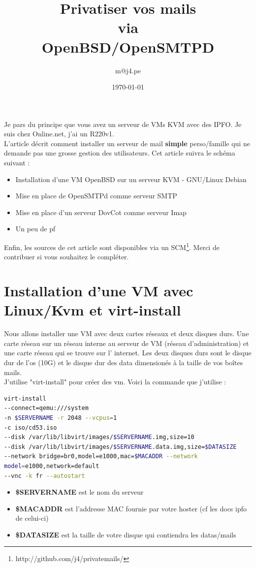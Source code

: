 \documentclass[a4paper,11pt]{article}
\title{Privatiser vos mails\\via\\OpenBSD/OpenSMTPD}
\author{m@j4.pe}
\date{\today}
\begin{document}
\maketitle

\abstract 

Je pars du principe que vous avez un serveur de VMs KVM avec des IPFO. Je suis
chez Online.net, j'ai un R220v1.\\
L'article décrit comment installer un serveur de mail {\bf simple} perso/famille 
qui ne demande pas une grosse gestion des utilisateurs.
Cet article suivra le schéma suivant :\\
\begin{itemize}
	\item Installation d'une VM OpenBSD sur un serveur KVM - GNU/Linux Debian
	\item Mise en place de OpenSMTPd comme serveur SMTP
	\item Mise en place d'un serveur DovCot comme serveur Imap
	\item Un peu de pf
\end{itemize} 
\vspace{5mm}
Enfin, les sources de cet article sont disponibles via un SCM\footnote{http://github.com/j4/privatemails/}. 
Merci de contribuer si vous souhaitez le compléter.

\section*{Installation d'une VM avec Linux/Kvm et virt-install}

Nous allons installer une VM avec deux cartes réseaux et deux disques durs. Une
carte réseau sur un réseau interne au serveur de VM (réseau d'administration)
et une carte réseau qui se trouve sur l' internet. Les deux disques durs sont
le disque dur de l'os (10G) et le disque dur des data dimensionés à la taille
de vos boîtes mails.\\
J'utilise "virt-install" pour créer des vm. Voici la commande que j'utilise :

\vspace{5mm}
\begin{lstlisting}[language=bash,caption={Création d'une VM OpenBSD avec KVM},frame=bt,breaklines=true]
virt-install 
--connect=qemu:///system 
-n $SERVERNAME -r 2048 --vcpus=1 
-c iso/cd53.iso 
--disk /var/lib/libvirt/images/$SERVERNAME.img,size=10 
--disk /var/lib/libvirt/images/$SERVERNAME.data.img,size=$DATASIZE 
--network bridge=br0,model=e1000,mac=$MACADDR --network 
model=e1000,network=default 
--vnc -k fr --autostart
\end{lstlisting}
\vspace{5mm}
\begin{itemize}
	\item {\bf \$SERVERNAME} est le nom du serveur
	\item {\bf \$MACADDR} est l'addresse MAC fournie par votre hoster (cf les docs ipfo de
celui-ci)
	\item {\bf \$DATASIZE} est la taille de votre disque qui contiendra les datas/mails
\end{itemize}
\end{document}
